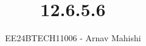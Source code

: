 \documentclass[journal]{IEEEtran}
\begin{document}

\vspace{3cm}

\title{12.6.5.6}
\author{EE24BTECH11006 - Arnav Mahishi}
{\let\newpage\relax\maketitle}

\renewcommand{\thefigure}{\theenumi}
\renewcommand{\thetable}{\theenumi}
\setlength{\intextsep}{10pt} %


\renewcommand{\thetable}{\theenumi}
\end{document}
